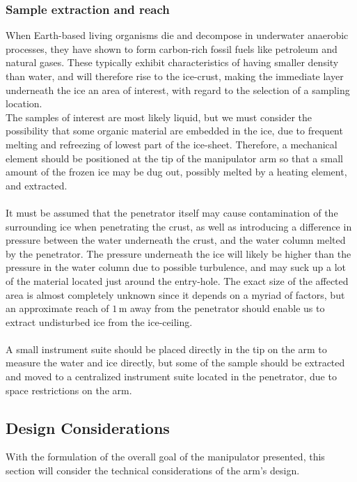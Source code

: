 \subsubsection{Sample extraction and reach}
When Earth-based living organisms die and decompose in underwater anaerobic processes, they have shown to form carbon-rich fossil fuels like petroleum and natural gases. These typically exhibit characteristics of having smaller density than water, and will therefore rise to the ice-crust, making the immediate layer underneath the ice an area of interest, with regard to the selection of a sampling location. \\
The samples of interest are most likely liquid, but we must consider the possibility that some organic material are embedded in the ice, due to frequent melting and refreezing of lowest part of the ice-sheet. Therefore, a mechanical element should be positioned at the tip of the manipulator arm so that a small amount of the frozen ice may be dug out, possibly melted by a heating element, and extracted.
\\
\\It must be assumed that the penetrator itself may cause contamination of the surrounding ice when penetrating the crust, as well as introducing a difference in pressure between the water underneath the crust, and the water column melted by the penetrator. The pressure underneath the ice will likely be higher than the pressure in the water column due to possible turbulence, and may suck up a lot of the material located just around the entry-hole. The exact size of the affected area is almost completely unknown since it depends on a myriad of factors, but an approximate reach of $1\,\mathrm{m}$ away from the penetrator should enable us to extract undisturbed ice from the ice-ceiling.
\\
\\A small instrument suite should be placed directly in the tip on the arm to measure the water and ice directly, but some of the sample should be extracted and moved to a centralized instrument suite located in the penetrator, due to space restrictions on the arm.

\subsection{Design Considerations}
With the formulation of the overall goal of the manipulator presented, this section will consider the technical considerations of the arm's design.
